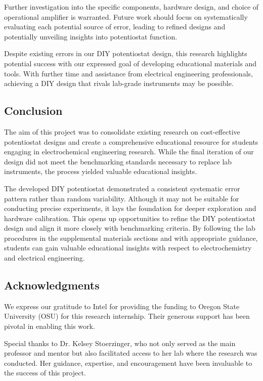 \documentclass{article}
\begin{document}
Further investigation into the specific components, hardware design, and choice of operational amplifier is warranted. Future work should focus on systematically evaluating each potential source of error, leading to refined designs and potentially unveiling insights into potentiostat function.



Despite existing errors in our DIY potentiostat design, this research highlights potential success with our expressed goal of developing educational materials and tools. With further time and assistance from electrical engineering professionals, achieving a DIY design that rivals lab-grade instruments may be possible.

\subsection*{Conclusion}
The aim of this project was to consolidate existing research on cost-effective potentiostat designs and create a comprehensive educational resource for students engaging in electrochemical engineering research. While the final iteration of our design did not meet the benchmarking standards necessary to replace lab instruments, the process yielded valuable educational insights.

The developed DIY potentiostat demonstrated a consistent systematic error pattern rather than random variability. Although it may not be suitable for conducting precise experiments, it lays the foundation for deeper exploration and hardware calibration. This opens up opportunities to refine the DIY potentiostat design and align it more closely with benchmarking criteria. By following the lab procedures in the supplemental materials sections and with appropriate guidance, students can gain valuable educational insights with respect to electrochemistry and electrical engineering.

\newpage
\subsection*{Acknowledgments}

We express our gratitude to Intel for providing the funding to Oregon State University (OSU) for this research internship. Their generous support has been pivotal in enabling this work.


Special thanks to Dr. Kelsey Stoerzinger, who not only served as the main professor and mentor but also facilitated access to her lab where the research was conducted. Her guidance, expertise, and encouragement have been invaluable to the success of this project.
\end{document}
